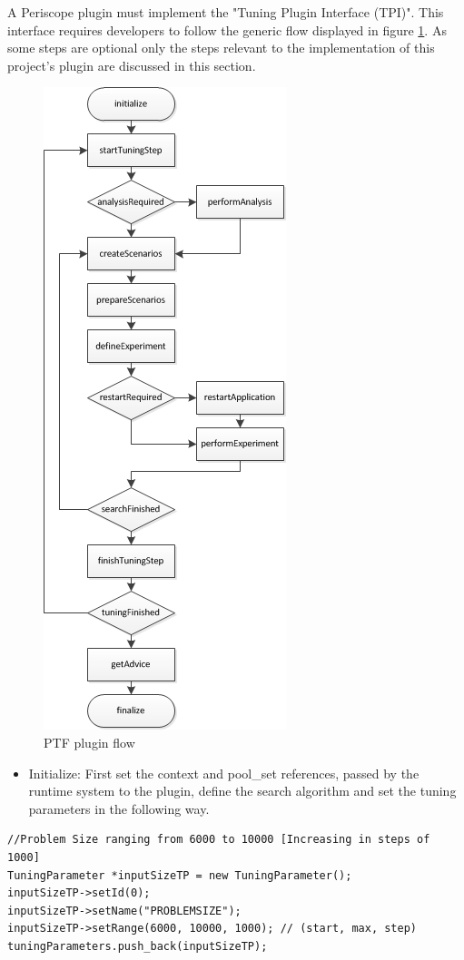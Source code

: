 \documentclass[10pt,twocolumn]{article}
\begin{document}
A Periscope plugin must implement the "Tuning Plugin Interface (TPI)". This interface requires developers to follow the generic flow displayed in figure \ref{fig:flow}. As some steps are optional only the steps relevant to the implementation of this project's plugin are discussed in this section.

\begin{figure}[h]
	\centering
	\includegraphics[scale=0.5]{ptf_flow}
	\caption{PTF plugin flow \cite{flow}}
	\label{fig:flow}
\end{figure}

\begin{itemize}

\item Initialize: First set the context and pool\_set references, passed by the runtime system to the plugin, define the search algorithm and set the tuning parameters in the following way.
\end{itemize}
\begin{lstlisting}
//Problem Size ranging from 6000 to 10000 [Increasing in steps of 1000]
TuningParameter *inputSizeTP = new TuningParameter();
inputSizeTP->setId(0);
inputSizeTP->setName("PROBLEMSIZE");
inputSizeTP->setRange(6000, 10000, 1000); // (start, max, step)
tuningParameters.push_back(inputSizeTP);
\end{lstlisting}
\end{document}
